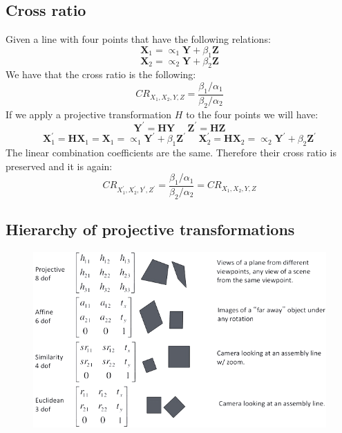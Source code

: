 \documentclass[12pt, a4paper]{report}
\newtheorem[style=M,bodystyle=\normalfont]{theorem}{Theorem}
\newtheorem[style=M,bodystyle=\normalfont]{corollary}{Corollary}
\newtheorem[style=M,bodystyle=\normalfont]{lemma}{Lemma}
\newtheorem[style=M,bodystyle=\normalfont]{definition}{Definition}
\begin{document}
    \subsection{Cross ratio}
    Given a line with four points that have the following relations: 
    \[\boldsymbol{X}_1=\propto_1\boldsymbol{Y}+\beta_1\boldsymbol{Z}\]
    \[\boldsymbol{X}_2=\propto_2\boldsymbol{Y}+\beta_2\boldsymbol{Z}\]
    We have that the cross ratio is the following: 
    \[CR_{X_1,X_2,Y,Z}=\dfrac{\beta_1/\alpha_1}{\beta_2/\alpha_2}\]
    If we apply a projective transformation $H$ to the four points we will have: 
    \[\boldsymbol{Y}^{'}=\boldsymbol{HY} \:\:\:\:\:\: \boldsymbol{Z}^{'}=\boldsymbol{HZ}\] 
    \[\boldsymbol{X}^{'}_1=\boldsymbol{HX}_1=\boldsymbol{X}_1=\propto_1\boldsymbol{Y}^{'}+\beta_1\boldsymbol{Z}^{'} \:\:\:\:\:\: \boldsymbol{X}^{'}_2=\boldsymbol{HX}_2=\propto_2\boldsymbol{Y}^{'}+\beta_2\boldsymbol{Z}^{'}\]
    The linear combination coefficients are the same. Therefore their cross ratio is preserved and it is again: 
    \[CR_{X_1^{'},X_2^{'},Y^{'},Z^{'}}=\dfrac{\beta_1/\alpha_1}{\beta_2/\alpha_2}=CR_{X_1,X_2,Y,Z}\]

    \subsection{Hierarchy of projective transformations}
    \begin{figure}[H]
        \centering
        \includegraphics[width=1\linewidth]{images/hierarchy.png}
    \end{figure}
\end{document}
